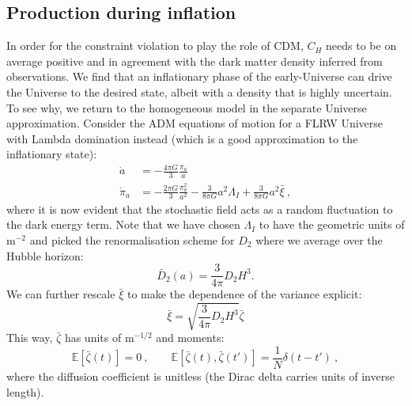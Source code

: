 \documentclass[amsmath,amssymb,11pt]{article}
\begin{document}
\subsection{Production during inflation}
In order for the constraint violation to play the role of CDM, $C_H$ needs to be on average positive and in agreement with the dark matter density inferred from observations. We find that an inflationary phase of the early-Universe can drive the Universe to the desired state, albeit with a density that is highly uncertain. To see why, we return to the homogeneous model in the separate Universe approximation. Consider the ADM equations of motion for a FLRW Universe with Lambda domination instead (which is a good approximation to the inflationary state):
\begin{align}
\label{eq:inflation}
    \dot{a} &= -\frac{4\pi G}{3} \frac{\pi_a}{a} \\
    \dot{\pi}_a &= - \frac{2 \pi G}{3} \frac{\pi_a^2}{a^2}-\frac{3}{8\pi G} a^2\Lambda_I + \frac{3}{8\pi G} a^2 \bar{\xi}  \ ,
\end{align}
where it is now evident that the stochastic field acts as a random fluctuation to the dark energy term. Note that we have chosen $\Lambda_I$ to have the geometric units of $\text{m}^{-2}$ and picked the renormalisation scheme for $D_2$ where we average over the Hubble horizon:
\begin{equation}
    \bar{D}_2(a) =\frac{3}{4\pi} D_2 H^3.
\end{equation}
We can further rescale $\bar{\xi}$ to make the dependence of the variance explicit:
\begin{equation}
    \bar{\xi} = \sqrt{\frac{3}{4\pi}D_2 H^3} \bar{\zeta}
\end{equation}
This way, $\bar{\zeta}$ has units of $\text{m}^{-1/2}$ and moments:
\begin{equation}
     \mathbb{E}[\bar{\zeta}(t)] = 0 \ , \qquad \mathbb{E}[\bar{\zeta}(t),\bar{\zeta}(t')] = \frac{1}{N} \delta(t-t') \ ,
\end{equation}
where the diffusion coefficient is unitless (the Dirac delta carries units of inverse length).
\end{document}
